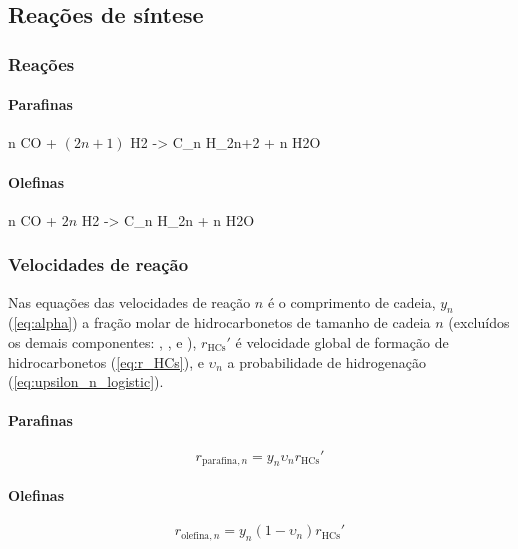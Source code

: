 \documentclass[portuguese,12pt,a4paper,onecolumn]{article}
\begin{document}
	\subsection{Reações de síntese}
	
	\subsubsection{Reações}
	
	\paragraph{Parafinas}
	\begin{reaction}
		n CO + $(2n + 1)$ H2 -> C_n H_{2n+2} + n H2O
	\end{reaction}
	
	\paragraph{Olefinas}
	\begin{reaction}
		n CO + $2 n$ H2 -> C_n H_{2n} + n H2O
	\end{reaction}
	
	\subsubsection{Velocidades de reação}
	
	Nas equações das velocidades de reação $n$ é o comprimento de cadeia, $y_n$ (\autoref{eq:alpha}) a fração molar de hidrocarbonetos de tamanho de cadeia $n$ (excluídos os demais componentes: , ,  e ), $r_\mathrm{HCs}'$ é velocidade global de formação de hidrocarbonetos (\autoref{eq:r_HCs}), e $\upsilon_n$ a probabilidade de hidrogenação (\autoref{eq:upsilon_n_logistic}).
	
	\paragraph{Parafinas}
	\begin{equation}
		r_{\mathrm{parafina},n} = y_n \upsilon_n r_{\mathrm{HCs}}'
	\end{equation}
	
	\paragraph{Olefinas}
	\begin{equation}
		r_{\mathrm{olefina},n} = y_n (1 - \upsilon_n) r_{\mathrm{HCs}}'
	\end{equation}
	
\end{document}
